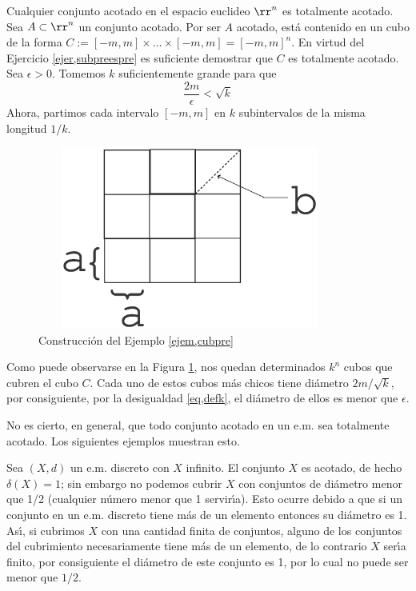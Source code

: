 \begin{ejemplo}\label{ejem,cubpre} Cualquier conjunto  acotado en el espacio euclideo
$\rr^n$ es totalmente acotado. Sea $A\subset\rr^n$ un conjunto
acotado. Por ser $A$ acotado, est\'a contenido en un cubo de la
forma $C:=[-m,m]\times\dots\times [-m,m]=[-m,m]^n$. En virtud del
Ejercicio \vref{ejer,subpreespre} es suficiente demostrar que $C$
es totalmente acotado. Sea $\epsilon>0$. Tomemos $k$
suficientemente grande para que
\begin{equation}\label{eq,defk}
    \frac{2m}{\epsilon}<\sqrt{k}
\end{equation}
Ahora, partimos cada intervalo $[-m,m]$ en $k$ subintervalos de la
misma longitud $1/k$.

\begin{figure}[h]
\begin{center}
    \includegraphics[height=6cm, width=10cm]{cubpre.eps}
    \caption{Construcci\'on del Ejemplo
    \ref{ejem,cubpre}}\label{fig,cubpre}
\end{center}
\end{figure}

Como puede observarse en la Figura \ref{fig,cubpre}, nos quedan
determinados $k^n$ cubos que cubren el cubo $C$. Cada uno de estos
cubos m\'as chicos tiene di\'ametro $2m/\sqrt{k}$, por
consiguiente, por la desigualdad \ref{eq,defk}, el di\'ametro de
ellos es menor que $\epsilon$.
\end{ejemplo}

No es cierto, en general, que todo conjunto acotado en un e.m. sea
totalmente acotado. Los siguientes ejemplos muestran esto.

\begin{ejemplo} Sea $(X,d)$ un e.m. discreto con $X$ infinito. El
conjunto $X$ es acotado, de hecho $\delta(X)=1$; sin embargo no
podemos cubrir $X$ con conjuntos de di\'ametro menor que 1/2
(cualquier n\'umero menor que 1 servir\'{\i}a). Esto ocurre debido
a que si un conjunto en un e.m. discreto tiene m\'as de un
elemento entonces su di\'ametro es 1. As\'{\i}, si cubrimos $X$
con una cantidad finita de conjuntos, alguno de los conjuntos del
cubrimiento necesariamente tiene m\'as de un elemento, de lo
contrario $X$ ser\'{\i}a finito, por consiguiente el di\'ametro de
este conjunto es 1, por lo cual no puede ser menor que $1/2$.
\end{ejemplo}

